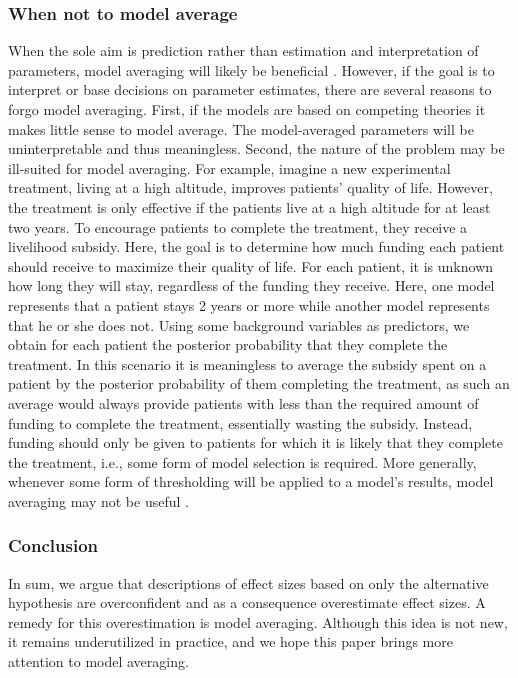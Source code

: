 \documentclass[a4paper]{article}
\begin{document}
\subsubsection*{When not to model average}
When the sole aim is prediction rather than estimation and interpretation of parameters, model averaging will likely be beneficial \cite<but see>{minka2000bayesian}. However, if the goal is to interpret or base decisions on parameter estimates, there are several reasons to forgo model averaging. First, if the models are based on competing theories it makes little sense to model average. The model-averaged parameters will be uninterpretable and thus meaningless. Second, the nature of the problem may be ill-suited for model averaging. For example, imagine a new experimental treatment, living at a high altitude, improves patients' quality of life. However, the treatment is only effective if the patients live at a high altitude for at least two years. To encourage patients to complete the treatment, they receive a livelihood subsidy. Here, the goal is to determine how much funding each patient should receive to maximize their quality of life. For each patient, it is unknown how long they will stay, regardless of the funding they receive. Here, one model represents that a patient stays 2 years or more while another model represents that he or she does not. Using some background variables as predictors, we obtain for each patient the posterior probability that they complete the treatment. In this scenario it is meaningless to average the subsidy spent on a patient by the posterior probability of them completing the treatment, as such an average would always provide patients with less than the required amount of funding to complete the treatment, essentially wasting the subsidy. Instead, funding should only be given to patients for which it is likely that they complete the treatment, i.e., some form of model selection is required. More generally, whenever some form of thresholding will be applied to a model's results, model averaging may not be useful \cite<see also>{HaafEtAl2019Nature}.

\subsubsection*{Conclusion}
In sum, we argue that descriptions of effect sizes based on only the alternative hypothesis are overconfident and as a consequence overestimate effect sizes. A remedy for this overestimation is model averaging. Although this idea is not new, it remains underutilized in practice, and we hope this paper brings more attention to model averaging.
\end{document}
